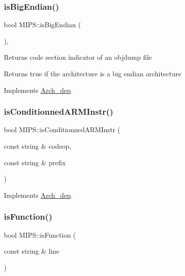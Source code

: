 \subsubsection{\texorpdfstring{is\+Big\+Endian()}{isBigEndian()}}
{\footnotesize\ttfamily bool M\+I\+P\+S\+::is\+Big\+Endian (\begin{DoxyParamCaption}{ }\end{DoxyParamCaption})\hspace{0.3cm}{\ttfamily [inline]}, {\ttfamily [virtual]}}

Returns code section indicator of an objdump file

Returns true if the architecture is a big endian architecture 

Implements \hyperlink{classArch__dep_a2734ff9ad6b2d894a2573eaedcd46989}{Arch\+\_\+dep}.

\mbox{\label{classMIPS_a1ef435e9100290e46e91863960b64c71}} 
\subsubsection{\texorpdfstring{is\+Conditionned\+A\+R\+M\+Instr()}{isConditionnedARMInstr()}}
{\footnotesize\ttfamily bool M\+I\+P\+S\+::is\+Conditionned\+A\+R\+M\+Instr (\begin{DoxyParamCaption}\item[{const string \&}]{codeop,  }\item[{const string \&}]{prefix }\end{DoxyParamCaption})\hspace{0.3cm}{\ttfamily [virtual]}}



Implements \hyperlink{classArch__dep_a41eb152029e2792b59337bc4b370ec9f}{Arch\+\_\+dep}.

\mbox{\label{classMIPS_a2de73769c68612b81e2e15b4eaf07969}} 
\subsubsection{\texorpdfstring{is\+Function()}{isFunction()}}
{\footnotesize\ttfamily bool M\+I\+P\+S\+::is\+Function (\begin{DoxyParamCaption}\item[{const string \&}]{line }\end{DoxyParamCaption})\hspace{0.3cm}{\ttfamily [virtual]}}

